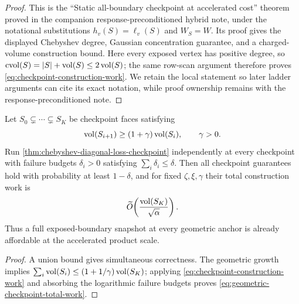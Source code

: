 \begin{proof}
This is the ``Static all-boundary checkpoint at accelerated cost'' theorem
proved in the companion response-preconditioned hybrid note, under the
notational substitutions $h_v(S)=\ell_v(S)$ and $W_S=W$.  Its proof gives
the displayed Chebyshev degree, Gaussian concentration guarantee, and a
charged-volume construction bound.  Here every exposed vertex has positive
degree, so
$\operatorname{cvol}(S)=|S|+\operatorname{vol}(S)\leq2\operatorname{vol}(S)$; the same row-scan argument
therefore proves \cref{eq:checkpoint-construction-work}.  We retain the local
statement so later ladder arguments can cite its exact notation, while proof
ownership remains with the response-preconditioned note.
\end{proof}

\begin{corollary}
\label{cor:geometric-diagonal-loss-checkpoints}
Let $S_0\subsetneq\cdots\subsetneq S_K$ be checkpoint faces satisfying
\begin{equation*}
 \operatorname{vol}(S_{i+1})\geq(1+\gamma)\operatorname{vol}(S_i),
 \qquad \gamma>0.
\end{equation*}
Run \cref{thm:chebyshev-diagonal-loss-checkpoint} independently at every
checkpoint with failure budgets $\delta_i>0$ satisfying
$\sum_i\delta_i\leq\delta$.  Then all checkpoint guarantees hold with
probability at least $1-\delta$, and for fixed $\zeta,\xi,\gamma$ their
total construction work is
\begin{equation}
 \widetilde O\!\left(
  \frac{\operatorname{vol}(S_K)}{\sqrt\alpha}
 \right).
 \label{eq:geometric-checkpoint-total-work}
\end{equation}
Thus a full exposed-boundary snapshot at every geometric anchor is already
affordable at the accelerated product scale.
\end{corollary}

\begin{proof}
A union bound gives simultaneous correctness.  The geometric growth implies
$\sum_i\operatorname{vol}(S_i)\leq(1+1/\gamma)\operatorname{vol}(S_K)$; applying
\cref{eq:checkpoint-construction-work} and absorbing the logarithmic failure
budgets proves \cref{eq:geometric-checkpoint-total-work}.
\end{proof}

